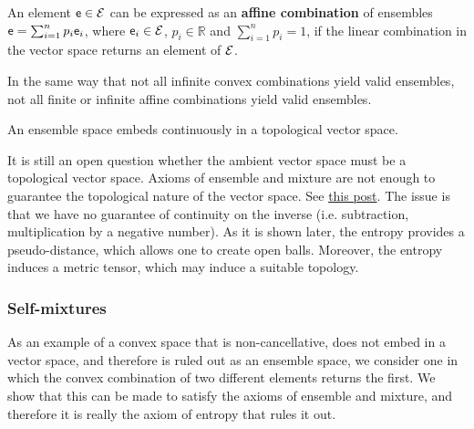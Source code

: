 \begin{mathSection}
\begin{defn}
	An element $\mathsf{e} \in \mathcal{E}$ can be expressed as an \textbf{affine combination} of ensembles $\mathsf{e} = \sum_{i=1}^{n} p_i \mathsf{e}_i$, where $\mathsf{e}_i \in \mathcal{E}$, $p_i \in \mathbb{R}$ and $\sum_{i=1}^{n} p_i = 1$, if the linear combination in the vector space returns an element of $\mathcal{E}$.
\end{defn}

\begin{remark}
	In the same way that not all infinite convex combinations yield valid ensembles, not all finite or infinite affine combinations yield valid ensembles.
\end{remark}

\begin{conj}\label{pm_es_ensemblesAreTVS}
	An ensemble space embeds continuously in a topological vector space.
\end{conj}

\begin{remark}
	It is still an open question whether the ambient vector space must be a topological vector space. Axioms of ensemble and mixture are not enough to guarantee the topological nature of the vector space. See \href{https://math.stackexchange.com/questions/4921905/cancellative-convex-spaces-and-topological-vector-spaces}{this post}. The issue is that we have no guarantee of continuity on the inverse (i.e. subtraction, multiplication by a negative number). As it is shown later, the entropy provides a pseudo-distance, which allows one to create open balls. Moreover, the entropy induces a metric tensor, which may induce a suitable topology.
\end{remark}

\end{mathSection}

\subsubsection{Self-mixtures}

As an example of a convex space that is non-cancellative, does not embed in a vector space, and therefore is ruled out as an ensemble space, we consider one in which the convex combination of two different elements returns the first. We show that this can be made to satisfy the axioms of ensemble and mixture, and therefore it is really the axiom of entropy that rules it out.

